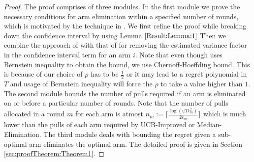 \begin{proof}
The proof comprises of three modules. In the first module we prove the necessary conditions for arm elimination within a specified number of rounds, which is motivated by the technique in \cite{auer2010ucb}. We first refine the proof while breaking down the confidence interval by using Lemma $\ref{Result:Lemma:1}$ Then we combine the approach of \citet{audibert2009exploration} with that of  \citet{auer2010ucb} for removing the estimated variance factor in the confidence interval term for an arm $i$. Note that even though \citet{audibert2009exploration} uses Bernstein inequality to obtain the  bound, we use Chernoff-Hoeffding bound. This is because of our choice of $\rho$ has to be $\frac{1}{2}$ or it may lead to a regret polynomial in $T$ and usage of Bernstein inequality will force the $\rho$ to take a value higher than $1$. The second module bounds the number of pulls required if an arm is eliminated on or before a particular number of rounds. Note that the number of pulls allocated in a round $m$ for each arm is atmost $n_{m}:=\bigg\lceil\frac{\log{(\psi T\epsilon_{m}^{2})}}{2\epsilon_{m}}\bigg\rceil$ which is much lower than the pulls of each arm required by UCB-Improved or Median-Elimination. The third module deals with bounding the regret given a sub-optimal arm eliminates the optimal arm. The detailed proof is given in Section \ref{sec:proofTheorem:Theorem1}.
\end{proof}



